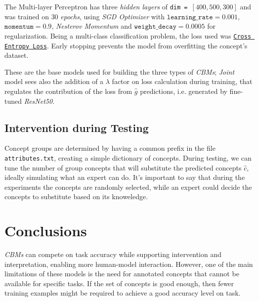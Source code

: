 \documentclass[10pt, twocolumn, letterpaper]{article}
\begin{document}
The Multi-layer Perceptron has three \textit{hidden layers} of \texttt{dim = }$ [400, 500, 300]$ and was trained on $30$ \textit{epochs}, using \textit{SGD Optimizer} with $\texttt{learning\_rate} = 0.001$, $\texttt{momentum} = 0.9$, \textit{Nesterov Momentum}\cite{botev2017nesterov} and $\texttt{weight\_decay} = 0.0005$ for regularization. Being a multi-class classification problem, the loss used was \href{https://pytorch.org/docs/stable/generated/torch.nn.CrossEntropyLoss.html}{\texttt{Cross Entropy Loss}}. Early stopping prevents the model from overfitting the concept's dataset.

These are the base models used for building the three types of \textit{CBMs}; \textit{Joint} model sees also the addition of a $\lambda$ factor on loss calculation during training, that regulates the contribution of the loss from $\hat{g}$ predictions, i.e. generated by fine-tuned \textit{ResNet50}.
\subsection{Intervention during Testing}
Concept groups are determined by having a common prefix in the file \texttt{attributes.txt}, creating a simple dictionary of concepts. During testing,
we can tune the number of group concepts that will substitute the predicted concepts $\hat{c}$, ideally simulating what an expert can do.
It's important to say that during the experiments the concepts are randomly selected, while an expert could decide the concepts to substitute based on its knoweledge.

\section{Conclusions}
\textit{CBMs} can compete on task accuracy while supporting intervention and interpretation, enabling more human-model interaction. However, one of the main limitations of these models is the need for annotated concepts that cannot be available for specific tasks. If the set of concepts is good enough, then fewer training examples might be required to achieve a good accuracy level on task.



\end{document}
